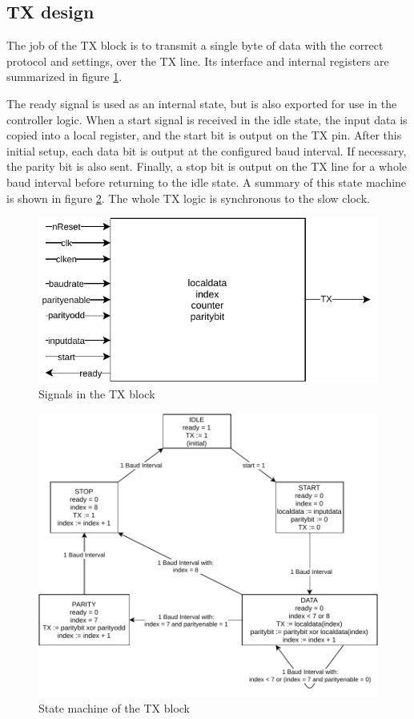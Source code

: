 \documentclass[12pt,a4paper]{article}
\begin{document}
\subsection{TX design}

The job of the TX block is to transmit a single byte of data with the correct protocol and settings, over the TX line. Its interface and internal registers are summarized in figure \ref{fig:tx}.

The ready signal is used as an internal state, but is also exported for use in the controller logic. When a start signal is received in the idle state, the input data is copied into a local register, and the start bit is output on the TX pin. After this initial setup, each data bit is output at the configured baud interval. If necessary, the parity bit is also sent. Finally, a stop bit is output on the TX line for a whole baud interval before returning to the idle state. A summary of this state machine is shown in figure \ref{fig:smtx}. The whole TX logic is synchronous to the slow clock.

\begin{figure}[p]
	\centering
	\includegraphics[width=.7\textwidth]{tx}
	\caption{Signals in the TX block}
	\label{fig:tx}
\end{figure}

\begin{figure}[p]
	\centering
	\includegraphics[width=\textwidth]{smtx}
	\caption{State machine of the TX block}
	\label{fig:smtx}
\end{figure}
\end{document}
